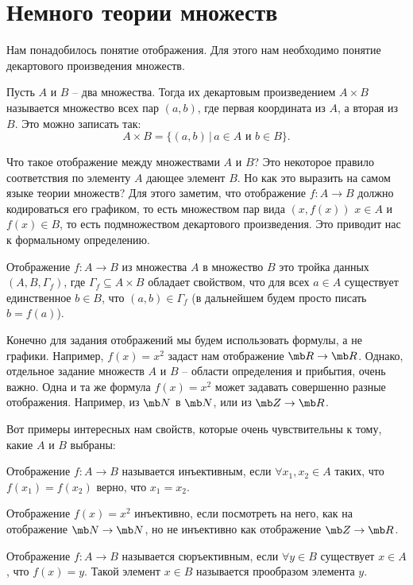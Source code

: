 \section{Немного теории множеств}

Нам понадобилось понятие отображения. Для этого нам необходимо понятие декартового произведения множеств.

\dfn Пусть $A$ и $B$ -- два множества. Тогда их декартовым произведением $A\times B$ называется множество всех пар $(a,b)$, где первая координата из $A$, а вторая из $B$. Это можно записать так:
$$ A \times B = \{ (a,b) \, | \, a \in A \text{ и } b \in B \}.$$
\edfn

Что такое отображение между множествами $A$  и $B$? Это некоторое правило соответствия по элементу $A$ дающее элемент $B$. Но как это выразить на самом языке теории множеств? Для этого заметим, что отображение $f\colon A \to B$ должно кодироваться его графиком, то есть множеством пар вида $(x,f(x))$ $x\in A$ и $f(x)\in B$, то есть подмножеством декартового произведения. Это приводит нас к формальному определению.


\dfn Отображение $f \colon A \to B$ из множества $A$ в множество $B$ это тройка данных $(A,B,\Gamma_f)$, где $\Gamma_f \subseteq A \times B$ обладает свойством, что для всех $a \in A$ существует единственное $b \in B$, что $(a,b) \in \Gamma_f$ (в дальнейшем будем просто писать $b=f(a)$). 
\edfn

Конечно для задания отображений мы будем использовать формулы, а не графики. Например, $f(x)=x^2$ задаст нам отображение $\mb R \to \mb R$. Однако, отдельное задание множеств $A$ и $B$ -- области определения и прибытия, очень важно. Одна и та же формула $f(x)=x^2$ может задавать совершенно разные отображения. Например, из $\mb N$ в $\mb N$, или из $\mb Z \to \mb R$.

Вот примеры интересных нам свойств, которые очень чувствительны к тому, какие $A$ и $B$ выбраны:

\dfn Отображение $f \colon A \to B$ называется инъективным, если $\forall x_1,x_2 \in A$ таких, что $f(x_1)=f(x_2)$ верно, что $x_1=x_2$.
\edfn

Отображение $f(x)=x^2$ инъективно, если посмотреть на него, как на отображение $\mb N \to \mb N$, но не инъективно как отображение $\mb Z \to \mb R$.

\dfn Отображение $f \colon A \to B$ называется сюръективным, если $\forall y\in B$ существует $x \in A$, что $f(x)=y$. Такой элемент $x\in B$ называется прообразом элемента $y$.
\edfn

